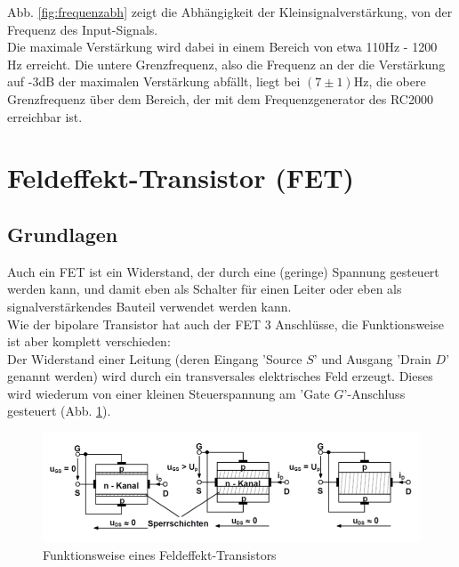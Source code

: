 \documentclass[12pt,a4paper]{article}
\begin{document}
\begin{multicols}{2}
Abb. \ref{fig:frequenzabh} zeigt die Abhängigkeit der Kleinsignalverstärkung, von der Frequenz des Input-Signals.\\
Die maximale Verstärkung wird dabei in einem Bereich von etwa 110Hz - 1200 Hz erreicht. Die untere Grenzfrequenz, also die Frequenz an der die Verstärkung auf -3dB der maximalen Verstärkung abfällt, liegt bei $(7 \pm 1)$Hz, die obere Grenzfrequenz über dem Bereich, der mit dem Frequenzgenerator des RC2000 erreichbar ist.

\section{Feldeffekt-Transistor (FET)}

\subsection{Grundlagen}

Auch ein FET ist ein Widerstand, der durch eine (geringe) Spannung gesteuert werden kann, und damit eben als Schalter für einen Leiter oder eben als signalverstärkendes Bauteil verwendet werden kann.\\
Wie der bipolare Transistor hat auch der FET 3 Anschlüsse, die Funktionsweise ist aber komplett verschieden:\\
Der Widerstand einer Leitung (deren Eingang 'Source $S$' und Ausgang 'Drain $D$' genannt werden) wird durch ein transversales elektrisches Feld erzeugt. Dieses wird wiederum von einer kleinen Steuerspannung am 'Gate $G$'-Anschluss gesteuert (Abb. \ref{fig:FET_skizze}).


\end{multicols}
\begin{figure}[H]
	\centering
	\includegraphics[scale=1]{./data/FET_skizze.png}
	\caption{Funktionsweise eines Feldeffekt-Transistors}
	\label{fig:FET_skizze}
\end{figure}
\end{document}
